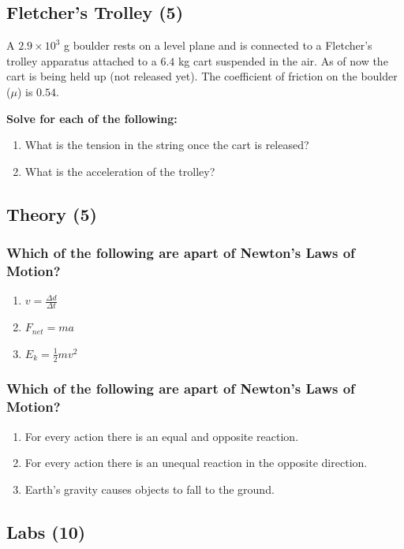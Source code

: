 \documentclass{article}
\begin{document}
\subsection{Fletcher's Trolley (5)}
A $2.9 \times 10^3$ g boulder rests on a level plane and is connected to a Fletcher's trolley apparatus
attached to a $6.4$ kg cart suspended in the air. As of now the cart is being held up (not released yet).
The coefficient of friction on the boulder ($\mu$) is $0.54$.

\vspace{10pt}

\noindent\textbf{Solve for each of the following:}
\begin{enumerate}[label=\alph*)]
    \item What is the tension in the string once the cart is released?
    \item What is the acceleration of the trolley?
\end{enumerate}\leavevmode

\subsection{Theory (5)}
\subsubsection{Which of the following are apart of Newton's Laws of Motion?}
\begin{enumerate}[label=\alph*)]
    \item $v = \frac{\Delta d}{\Delta t}$
    \item $F_{net} = ma$
    \item $E_{k} = \frac{1}{2}mv^2$
\end{enumerate}\leavevmode
\subsubsection{Which of the following are apart of Newton's Laws of Motion?}
\begin{enumerate}[label=\alph*)]
    \item For every action there is an equal and opposite reaction.
    \item For every action there is an unequal reaction in the opposite direction.
    \item Earth's gravity causes objects to fall to the ground.
\end{enumerate}

\subsection{Labs (10)}
\end{document}
